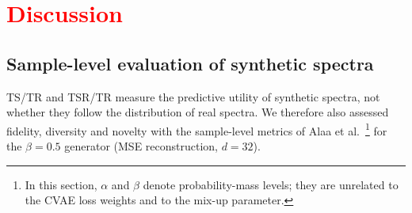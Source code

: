\documentclass[12pt]{article}
\theoremstyle{paper}
\begin{document}


\section{\textcolor{red}{Discussion}}
 \label{sec:discussion}

\subsection{Sample-level evaluation of synthetic spectra}
\label{sec:alaa_discussion}

TS/TR and TSR/TR measure the predictive utility of synthetic spectra, not whether they follow the
distribution of real spectra. We therefore also assessed fidelity, diversity and novelty with the
sample-level metrics of Alaa et al.~\cite{pmlr-v162-alaa22a}\footnote{In this section, $\alpha$ and
$\beta$ denote probability-mass levels; they are unrelated to the CVAE loss weights and to the
mix-up parameter.} for the $\beta=0.5$ generator (MSE reconstruction, $d=32$).
\end{document}
